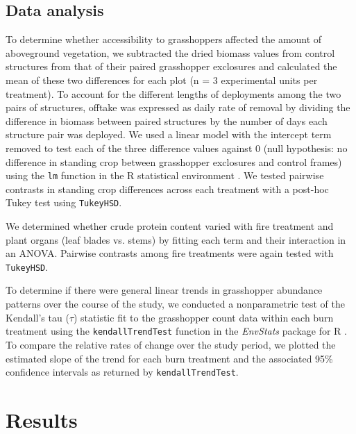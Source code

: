 \documentclass[referee, 
	            sn-basic]
           {sn-jnl}
\begin{document}
\subsection{Data analysis}

To determine whether accessibility to grasshoppers affected the amount of aboveground vegetation, we subtracted the dried biomass values from control structures from that of their paired grasshopper exclosures and calculated the mean of these two differences for each plot (n = 3 experimental units per treatment). 
To account for the different lengths of deployments among the two pairs of structures, offtake was expressed as daily rate of removal by dividing the difference in biomass between paired structures by the number of days each structure pair was deployed.  
We used a linear model with the intercept term removed to test each of the three difference values against 0 (null hypothesis: no difference in standing crop between grasshopper exclosures and control frames) using the \texttt{lm} function in the \textsf{R} statistical environment \citep{Rcore2020}. 
We tested pairwise contrasts in standing crop differences across each treatment with a post-hoc Tukey test using \texttt{TukeyHSD}.

We determined whether crude protein content varied with fire treatment and plant organs (leaf blades vs. stems) by fitting each term and their interaction in an ANOVA.
Pairwise contrasts among fire treatments were again tested with \texttt{TukeyHSD}.

To determine if there were general linear trends in grasshopper abundance patterns over the course of the study, we conducted a nonparametric test of the Kendall's tau (\(\tau\)) statistic fit to the grasshopper count data within each burn treatment using the \texttt{kendallTrendTest} function in the \emph{EnvStats} package for
\textsf{R} \citep{millard2013}.
To compare the relative rates of change over the study period, we plotted the estimated slope of the trend for each burn treatment and the associated 95\% confidence intervals as returned by \texttt{kendallTrendTest}.

\section{Results}
\end{document}

